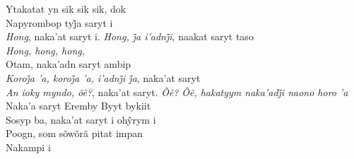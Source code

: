\begin{linenumbers}\begingroup\raggedright

\noindent   Ytakatat yn sik sik sik, dok\\
  Napyrombop tyj̃a saryt i\\
  \emph{Hong}, naka’at saryt i. \emph{Hong, j̃a i’adnj̃i}, naakat saryt taso\\
  \emph{Hong, hong, hong},\\
  Otam, naka'adn saryt ambip\\
  \emph{Koroj̃a ’a, koroj̃a ’a, i’adnj̃i j̃a}, naka’at saryt\\
  \emph{An ioky myndo, õẽ?}, naka’at saryt. \emph{Õẽ?} %
  \emph{Õẽ, hakatyym naka’adj̃i naono horo ’a}\\
  Naka'a saryt Eremby Byyt bykiit\\
  Sosyp ba, naka’at saryt i ohỹrym i\\
  Poogn, som sõwõrã pitat impan\\
  Nakampi i

\end{linenumbers}\endgroup

\bigskip


